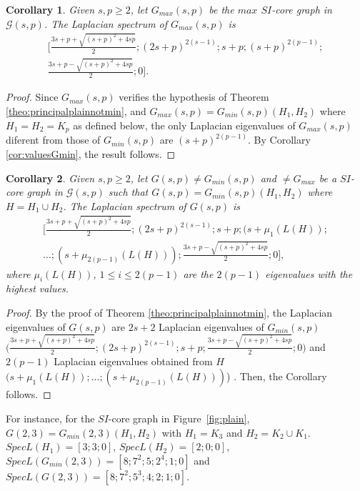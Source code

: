 \documentclass[preprint,12pt]{elsarticle}
\newtheorem{corollary}{Corollary}[theorem]
\begin{document}
\begin{corollary}\label{cor:valuesGmax}
Given $s,p \geq 2$, let $G_{max}(s,p)$ be the $max$ $SI$-core graph in $\mathcal{G}(s,p)$. The Laplacian spectrum of $G_{max}(s,p)$ is
\[
\begin{aligned}
\bigg[ \frac{3s+p  +\sqrt{(s+p)^2 + 4sp}}{2}; ( 2s+p)^{2(s-1)}; s+p; (s+p)^{2(p-1)}; \\
\frac{3s+p - \sqrt{(s+p)^2 + 4sp}}{2}; 0 \bigg].
\end{aligned}
\]

\end{corollary}
\begin{proof}
Since $G_{max}(s,p)$ verifies the hypothesis of Theorem \ref{theo:principalplainnotmin}, 
and $G_{max}(s,p) = G_{min}(s,p)(H_1, H_2)$ where $H_1 = H_2 = K_p$ as defined below, the only Laplacian eigenvalues of $G_{max}(s,p)$ diferent from those of $G_{min}(s,p)$ are $(s+p)^{2(p-1)}$. 
By Corollary \ref{cor:valuesGmin}, the result follows.
\end{proof}

\begin{corollary}\label{cor:valuesG}
Given $s,p \geq 2$, let $G(s,p) \not = G_{min}(s,p)$ and $\not = G_{max}$ be a $SI$-core graph in $\mathcal{G}(s,p)$ such that $G(s,p) = G_{min}(s,p)(H_1, H_2)$ where $H = H_1 \cup H_2$.  
The Laplacian spectrum of $G(s,p)$  is
\[
\begin{aligned}
\bigg[ \frac{3s+p  +\sqrt{(s+p)^2 + 4sp}}{2}; ( 2s+p)^{2(s-1)}; s+p; (s+\mu_{1}(L(H));\\ 
...; (s+\mu_{2(p-1)}(L(H))); \frac{3s+p - \sqrt{(s+p)^2 + 4sp}}{2}; 0 \bigg],
\end{aligned}
\]
where 
$\mu_{i}(L(H))$, $1 \leq i \leq 2(p-1)$ are the $2(p-1)$ eigenvalues with the highest values.
\end{corollary}
\begin{proof}
By the proof of Theorem \ref{theo:principalplainnotmin}, the Laplacian eigenvalues of $G(s,p)$ are $2s+2$ Laplacian eigenvalues of $G_{min}(s,p)$ $\bigg(\frac{3s+p  +\sqrt{(s+p)^2 + 4sp}}{2}; ( 2s+p)^{2(s-1)}; s+p;\frac{3s+p - \sqrt{(s+p)^2 + 4sp}}{2}; 0 \bigg)$ and $2(p-1)$ Laplacian eigenvalues obtained from $H$ $(s+\mu_{1}(L(H));...; (s+\mu_{2(p-1)}(L(H)))$) . Then, the Corollary follows. 
\end{proof}

\bigskip

For instance, for the $SI$-core graph in Figure~\ref{fig:plain}, $G(2,3) = G_{min}(2,3)(H_1, H_2)$ with $H_1 = K_3$ and $H_2 = K_2 \cup K_1$.   $SpecL(H_1) = [3; 3; 0]$, $SpecL(H_2) = [2; 0; 0]$, $SpecL(G_{min}(2,3)) = [8; 7^2; 5; 2^4; 1; 0]$ and $SpecL(G(2,3)) = [8; 7^2; 5^3; 4; 2; 1; 0]$.
\end{document}
